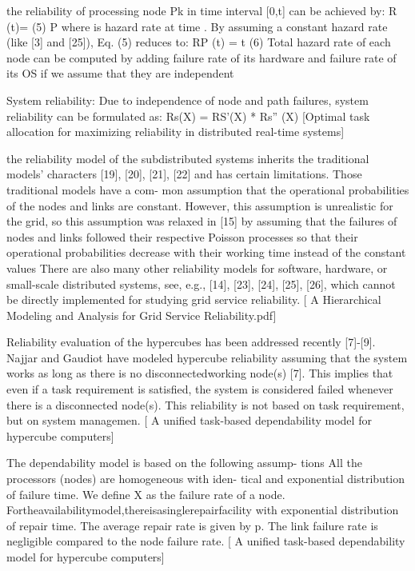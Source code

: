 \documentclass{cslthse-msc}
\begin{document}
the reliability of processing node Pk in
time interval [0,t] can be achieved by:
R (t)=            (5) P 
where       is hazard rate at time  . By assuming a constant hazard rate (like [3] and [25]), Eq. (5) reduces to:
RP (t) =       t (6) Total hazard rate of each node can be computed by adding failure rate of its hardware and failure rate of its OS if we assume that they are independent 

System reliability: Due to independence of node and path failures, system reliability can be formulated as: Rs(X) = RS’(X) * Rs” (X) [Optimal task allocation for maximizing reliability in distributed real-time systems]

the reliability model of the subdistributed systems inherits the traditional models’ characters [19], [20], [21], [22] and has certain limitations. Those traditional models have a com- mon assumption that the operational probabilities of the nodes and links are constant. However, this assumption is unrealistic for the grid, so this assumption was relaxed in [15] by assuming that the failures of nodes and links followed their respective Poisson processes so that their operational probabilities decrease with their working time instead of the constant values 
There are also many other reliability models for software, hardware, or small-scale distributed systems, see, e.g., [14], [23], [24], [25], [26], which cannot be directly implemented for studying grid service reliability. [ A Hierarchical Modeling and Analysis for Grid Service Reliability.pdf]

Reliability evaluation of the hypercubes has been addressed recently [7]-[9]. Najjar and Gaudiot have modeled hypercube reliability assuming that the system works as long as there is no disconnectedworking node(s) [7]. This implies that even if a task requirement is satisfied, the system is considered failed whenever there is a disconnected node(s). This reliability is not based on task requirement, but on system managemen.  [ A unified task-based dependability model for hypercube computers]

The dependability model is based on the following assump- tions All the processors (nodes) are homogeneous with iden- tical and exponential distribution of failure time. We define X as the failure rate of a node. Fortheavailabilitymodel,thereisasinglerepairfacility with exponential distribution of repair time. The average repair rate is given by p.
The link failure rate is negligible compared to the node failure rate. [ A unified task-based dependability model for hypercube computers]
\end{document}
